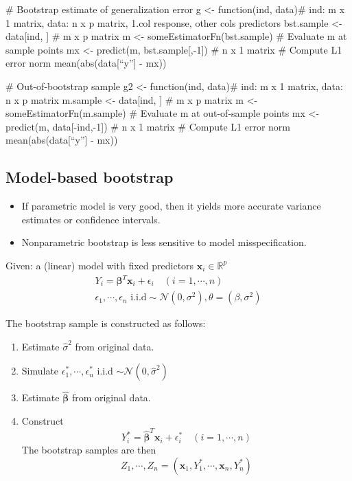  \begin{code}
  # Bootstrap estimate of generalization error
  g <- function(ind, data){# ind: m x 1 matrix, data: n x p matrix, 1.col response, other cols predictors
    bst.sample <- data[ind, ] # m x p matrix
    m <- someEstimatorFn(bst.sample)
    # Evaluate m at sample points
    mx <- predict(m, bst.sample[,-1]) # n x 1 matrix
    # Compute L1 error norm
    mean(abs(data[``y''] - mx))
  }
  
  # Out-of-bootstrap sample
  g2 <- function(ind, data){# ind: m x 1 matrix, data: n x p matrix
    m.sample <- data[ind, ] # m x p matrix
    m <- someEstimatorFn(m.sample)
    # Evaluate m at out-of-sample points
    mx <- predict(m, data[-ind,-1]) # n x 1 matrix
    # Compute L1 error norm
    mean(abs(data[``y''] - mx))
  }
 \end{code}

 \subsection{Model-based bootstrap}
 \begin{application}
 \begin{itemize}
  \item[\leftthumbsup] If parametric model is very good, then it yields more accurate variance estimates or confidence intervals.
  \item[\leftthumbsdown] Nonparametric bootstrap is less sensitive to model misspecification.
 \end{itemize}
 \end{application}
 
 \begin{theory}
  Given: a (linear) model with fixed predictors $\mathbf{x}_i \in \mathbb{R}^p$
  \begin{gather*}
      Y_i = \boldsymbol{\beta}^T \mathbf{x}_i + \epsilon_i \quad (i = 1, \cdots, n) \\
     \epsilon_1, \cdots, \epsilon_n \text{ i.i.d} \sim \mathcal{N}(0, \sigma^2), \theta = (\beta, \sigma^2)
  \end{gather*}

  The bootstrap sample is constructed as follows:
  \begin{enumerate}
   \item Estimate $\hat{\sigma}^2$ from original data.
   \item Simulate $\epsilon_1^{\ast}, \cdots, \epsilon_n^{\ast}$ i.i.d $\sim \mathcal{N}(0, \hat{\sigma}^2)$
   \item Estimate $\boldsymbol{\hat{\beta}}$ from original data.
   \item Construct
         \begin{equation*}
             Y_i^{\ast} = \boldsymbol{\hat{\beta}}^T \mathbf{x}_i + \epsilon^{\ast}_i \quad (i = 1, \cdots, n)
         \end{equation*}
         The bootstrap samples are then
         \begin{equation*}
          Z_1, \cdots, Z_n = (\mathbf{x}_1, Y_1^{\ast}, \cdots, \mathbf{x}_n, Y_n^{\ast})
         \end{equation*}
  \end{enumerate}
 \end{theory}
 
